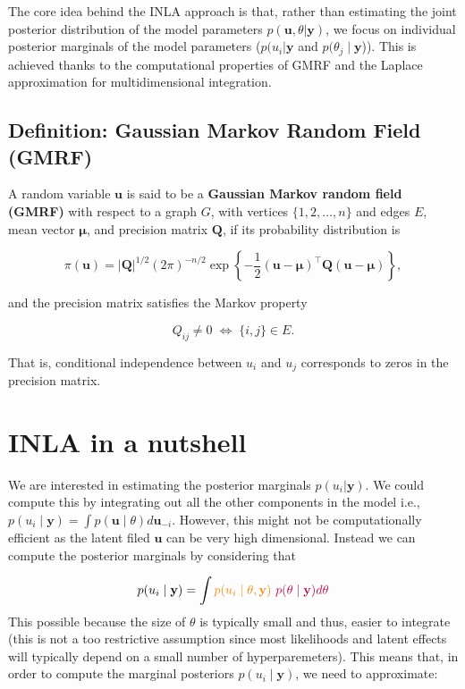 \documentclass[
  letterpaper,
  DIV=11,
  numbers=noendperiod]{scrartcl}
\begin{document}
The core idea behind the INLA approach is that, rather than estimating
the joint posterior distribution of the model parameters
\(p(\mathbf{u},\theta|\mathbf{y})\), we focus on individual posterior
marginals of the model parameters (\(p(u_i|\mathbf{y}\) and
\(p(\theta_j \mid \mathbf{y}\))). This is achieved thanks to the
computational properties of GMRF and the Laplace approximation for
multidimensional integration.

\subsection{Definition: Gaussian Markov Random Field
(GMRF)}\label{definition-gaussian-markov-random-field-gmrf}

A random variable \(\mathbf{u}\) is said to be a \textbf{Gaussian Markov
random field (GMRF)} with respect to a graph \(G\), with vertices
\(\{1,2,\dots,n\}\) and edges \(E\), mean vector \(\boldsymbol{\mu}\),
and precision matrix \(\mathbf{Q}\), if its probability distribution is

\[
\pi(\mathbf{u})
=
|\mathbf{Q}|^{1/2}(2\pi)^{-n/2}
\exp\left\{
-\frac{1}{2}
(\mathbf{u}-\boldsymbol{\mu})^{\top}
\mathbf{Q}
(\mathbf{u}-\boldsymbol{\mu})
\right\},
\]

and the precision matrix satisfies the Markov property

\[
Q_{ij} \neq 0
\;\Longleftrightarrow\;
\{i,j\} \in E.
\]

That is, conditional independence between \(u_i\) and \(u_j\)
corresponds to zeros in the precision matrix.

\section{INLA in a nutshell}\label{inla-in-a-nutshell}

We are interested in estimating the posterior marginals
\(p(u_i|\mathbf{y})\). We could compute this by integrating out all the
other components in the model i.e.,
\(p(u_i \mid \mathbf{y}) = \int p(\mathbf{u}\mid \theta) d \mathbf{u}_{-i}\).
However, this might not be computationally efficient as the latent filed
\(\mathbf{u}\) can be very high dimensional. Instead we can compute the
posterior marginals by considering that

\[
p(u_i \mid \mathbf{y}) = \int \color{orange}{ p(u_i\mid \theta,\mathbf{y})} ~\color{purple}{p(\theta\mid \mathbf{y})} d \theta
\] This possible because the size of \(\theta\) is typically small and
thus, easier to integrate (this is not a too restrictive assumption
since most likelihoods and latent effects will typically depend on a
small number of hyperparemeters). This means that, in order to compute
the marginal posteriors \(p(u_i \mid \mathbf{y})\), we need to
approximate:
\end{document}
